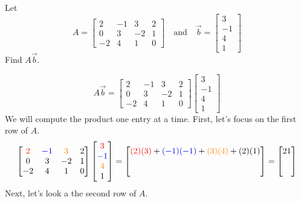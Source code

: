 \documentclass{ximera}
\begin{document}
\begin{example}\label{ex:matrixvectormultdef} Let $$A=\begin{bmatrix}2&-1&3&2\\0&3&-2&1\\-2&4&1&0\end{bmatrix}\quad\text{and}\quad \vec{b}=\begin{bmatrix}3\\-1\\4\\1\end{bmatrix}$$ Find $A\vec{b}$.
\begin{explanation}
$$A\vec{b}=\begin{bmatrix}2&-1&3&2\\0&3&-2&1\\-2&4&1&0\end{bmatrix}\begin{bmatrix}3\\-1\\4\\1\end{bmatrix}$$
We will compute the product one entry at a time.  First, let's focus on the first row of $A$.
$$\begin{bmatrix}{\color{red}2}&{\color{blue}-1}&{\color{orange}3}&2\\0&3&-2&1\\-2&4&1&0\end{bmatrix}\begin{bmatrix}{\color{red}3}\\{\color{blue}-1}\\{\color{orange}4}\\1\end{bmatrix}=\begin{bmatrix}{\color{red}(2)( 3)}+{\color{blue}(-1)(-1)}+{\color{orange}(3)(4)}+(2)(1)\\ \\ \\\end{bmatrix}=\begin{bmatrix}21\\ \\ \\\end{bmatrix}
$$
Next, let's look a the second row of $A$.

\end{explanation}
\end{example}
\end{document}
